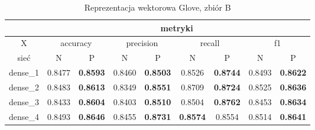 \begin{table}[h] \centering
    \caption{Reprezentacja wektorowa Glove, zbiór B}
    \label{tab:wyniki_glove_B}
    \begin{tabular} {|c|c|c|c|c|c|c|c|c| }    \hline
                 & \multicolumn{8}{c|}{metryki}                                                                                                                                                                                                                                                                             \\ \hline
        X        & \multicolumn{2}{c|}{accuracy}       & \multicolumn{2}{c|}{precision}      & \multicolumn{2}{c|}{recall}         & \multicolumn{2}{c|}{f1}                                                                                                                                                                \\ \hline
        sieć     & N                                   & P                                   & N                                   & P                              & N                                   & P                                   & N                                   & P                                   \\ \hline
        dense\_1 & 0.8477                              & \textbf{0.8593}                     & 0.8460                              & \textbf{0.8503}                & 0.8526                              & \textbf{0.8744}                     & 0.8493                              & \textbf{0.8622}                     \\ \hline
        dense\_2 & 0.8483                              & \textbf{0.8613}                     & 0.8349                              & \textbf{0.8551}                & 0.8709                              & \textbf{0.8724}                     & 0.8525                              & \textbf{0.8636}                     \\ \hline
        dense\_3 & 0.8433                              & \textbf{0.8604}                     & 0.8403                              & \textbf{0.8510}                & 0.8504                              & \textbf{0.8762}                     & 0.8453                              & \textbf{0.8634}                     \\ \hline
        dense\_4 & 0.8493                              & \textbf{0.8646}                     & 0.8455                              & \textbf{0.8731}                & \textbf{0.8574}                     & 0.8554                              & 0.8514                              & \textbf{0.8641}                     \\ \hline

\end{tabular}
\end{table}
